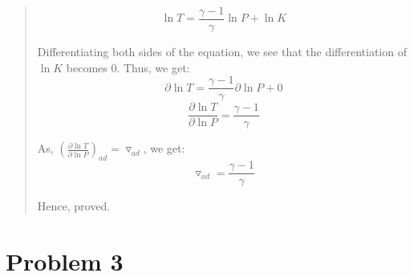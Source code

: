 \documentclass[10pt]{article}
\begin{document}
\begin{quote}
\[ \ln{T} = \frac{\gamma - 1}{\gamma} \ln{P} + \ln{K}\]

Differentiating both sides of the equation, we see that the differentiation of $\ln{K}$ becomes 0. Thus, we get:
\[ \partial  \ln{T} = \frac{\gamma - 1}{\gamma} \partial \ln{P} + 0 \]
\[ \frac{\partial \ln{T}}{\partial \ln{P}} = \frac{\gamma - 1}{\gamma}\]

As, ${(\frac{\partial \ln{T}}{\partial \ln{P}})}_{ad} = \triangledown_{ad}$, we get:
\[ \triangledown_{ad} = \frac{\gamma - 1}{\gamma}\]

Hence, proved.

\end{quote}

\section*{Problem 3}
\end{document}
